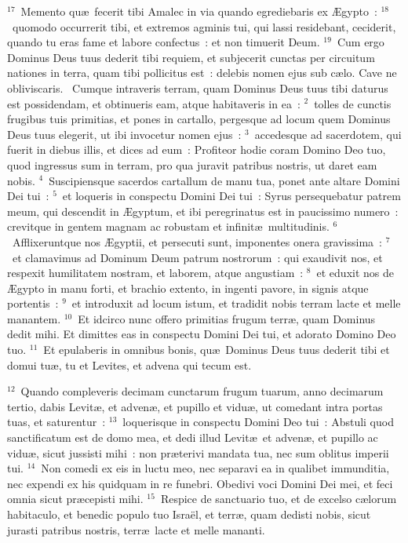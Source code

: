 ${}^{17}$~Memento qu\ae\ fecerit tibi Amalec in via quando egrediebaris ex \AE gypto~:
${}^{18}$~quomodo occurrerit tibi, et extremos agminis tui, qui lassi residebant, ceciderit, quando tu eras fame et labore confectus~: et non timuerit Deum.
${}^{19}$~Cum ergo Dominus Deus tuus dederit tibi requiem, et subjecerit cunctas per circuitum nationes in terra, quam tibi pollicitus est~: delebis nomen ejus sub c\ae lo. Cave ne obliviscaris.
~\lettrine[lines=10,image=true,loversize=0.05,lraise=-0.03]{C}{}umque intraveris terram, quam Dominus Deus tuus tibi daturus est possidendam, et obtinueris eam, atque habitaveris in ea~:
${}^{2}$~tolles de cunctis frugibus tuis primitias, et pones in cartallo, pergesque ad locum quem Dominus Deus tuus elegerit, ut ibi invocetur nomen ejus~:
${}^{3}$~accedesque ad sacerdotem, qui fuerit in diebus illis, et dices ad eum~: Profiteor hodie coram Domino Deo tuo, quod ingressus sum in terram, pro qua juravit patribus nostris, ut daret eam nobis.
${}^{4}$~Suscipiensque sacerdos cartallum de manu tua, ponet ante altare Domini Dei tui~:
${}^{5}$~et loqueris in conspectu Domini Dei tui~: Syrus persequebatur patrem meum, qui descendit in \AE gyptum, et ibi peregrinatus est in paucissimo numero~: crevitque in gentem magnam ac robustam et infinit\ae\ multitudinis.
${}^{6}$~Afflixeruntque nos \AE gyptii, et persecuti sunt, imponentes onera gravissima~:
${}^{7}$~et clamavimus ad Dominum Deum patrum nostrorum~: qui exaudivit nos, et respexit humilitatem nostram, et laborem, atque angustiam~:
${}^{8}$~et eduxit nos de \AE gypto in manu forti, et brachio extento, in ingenti pavore, in signis atque portentis~:
${}^{9}$~et introduxit ad locum istum, et tradidit nobis terram lacte et melle manantem.
${}^{10}$~Et idcirco nunc offero primitias frugum terr\ae , quam Dominus dedit mihi. Et dimittes eas in conspectu Domini Dei tui, et adorato Domino Deo tuo.
${}^{11}$~Et epulaberis in omnibus bonis, qu\ae\ Dominus Deus tuus dederit tibi et domui tu\ae , tu et Levites, et advena qui tecum est.


${}^{12}$~Quando compleveris decimam cunctarum frugum tuarum, anno decimarum tertio, dabis Levit\ae , et adven\ae , et pupillo et vidu\ae , ut comedant intra portas tuas, et saturentur~:
${}^{13}$~loquerisque in conspectu Domini Deo tui~: Abstuli quod sanctificatum est de domo mea, et dedi illud Levit\ae\ et adven\ae , et pupillo ac vidu\ae , sicut jussisti mihi~: non pr\ae terivi mandata tua, nec sum oblitus imperii tui.
${}^{14}$~Non comedi ex eis in luctu meo, nec separavi ea in qualibet immunditia, nec expendi ex his quidquam in re funebri. Obedivi voci Domini Dei mei, et feci omnia sicut pr\ae cepisti mihi.
${}^{15}$~Respice de sanctuario tuo, et de excelso c\ae lorum habitaculo, et benedic populo tuo Isra\"el, et terr\ae , quam dedisti nobis, sicut jurasti patribus nostris, terr\ae\ lacte et melle mananti.


